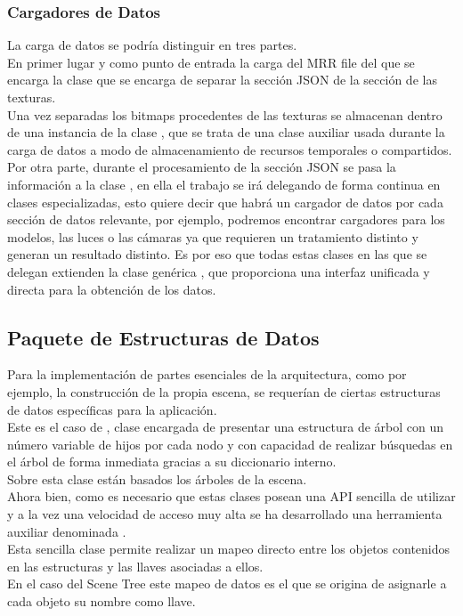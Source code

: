 \subsubsection{Cargadores de Datos}
La carga de datos se podría distinguir en tres partes.\\
En primer lugar y como punto de entrada la carga del MRR file del que se encarga la clase \rorefmrrloader que se encarga de separar la sección JSON de la sección de las texturas.\\
Una vez separadas los bitmaps procedentes de las texturas se almacenan dentro de una instancia de la clase \rorefresources, que se trata de una clase auxiliar usada durante la carga de datos a modo de almacenamiento de recursos temporales o compartidos.\\
Por otra parte, durante el procesamiento de la sección JSON se pasa la información a la clase \rorefrobottojsonloader, en ella el trabajo se irá delegando de forma continua en clases especializadas, esto quiere decir que habrá un cargador de datos por cada sección de datos relevante, por ejemplo, podremos encontrar cargadores para los modelos, las luces o las cámaras ya que requieren un tratamiento distinto y generan un resultado distinto. Es por eso que todas estas clases en las que se delegan extienden la clase genérica \rorefjsonbaseloader, que proporciona una interfaz unificada y directa para la obtención de los datos. 

\subsection{Paquete de Estructuras de Datos}
Para la implementación de partes esenciales de la arquitectura, como por ejemplo, la construcción de la propia escena, se requerían de ciertas estructuras de datos específicas para la aplicación.\\
Este es el caso de \roreftreemap, clase encargada de presentar una estructura de árbol con un número variable de hijos por cada nodo y con capacidad de realizar búsquedas en el árbol de forma inmediata gracias a su diccionario interno.\\
Sobre esta clase están basados los árboles de la escena.\\

Ahora bien, como es necesario que estas clases posean una API sencilla de utilizar y a la vez una velocidad de acceso muy alta se ha desarrollado una herramienta auxiliar denominada \rorefmapfunction.\\
Esta sencilla clase permite realizar un mapeo directo entre los objetos contenidos en las estructuras y las llaves asociadas a ellos.\\
En el caso del Scene Tree este mapeo de datos es el que se origina de asignarle a cada objeto su nombre como llave.

